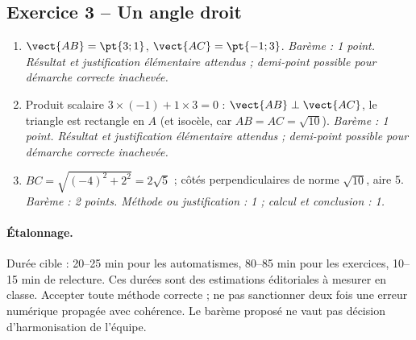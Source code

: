 \subsection*{Exercice 3 -- Un angle droit}
\begin{enumerate}
\item $\vect{AB}=\pt{3;1}$, $\vect{AC}=\pt{-1;3}$. \textit{Barème : 1 point. Résultat et justification élémentaire attendus ; demi-point possible pour démarche correcte inachevée.}
\item Produit scalaire $3\times(-1)+1\times3=0$ : $\vect{AB}\perp\vect{AC}$, le triangle est rectangle en $A$ (et isocèle, car $AB=AC=\sqrt{10}$). \textit{Barème : 1 point. Résultat et justification élémentaire attendus ; demi-point possible pour démarche correcte inachevée.}
\item $BC=\sqrt{(-4)^2+2^2}=2\sqrt5$ ; côtés perpendiculaires de norme $\sqrt{10}$, aire 5. \textit{Barème : 2 points. Méthode ou justification : 1 ; calcul et conclusion : 1.}
\end{enumerate}
\paragraph{Étalonnage.} Durée cible : 20–25 min pour les automatismes, 80–85 min pour les exercices, 10–15 min de relecture. Ces durées sont des estimations éditoriales à mesurer en classe. Accepter toute méthode correcte ; ne pas sanctionner deux fois une erreur numérique propagée avec cohérence. Le barème proposé ne vaut pas décision d’harmonisation de l’équipe.
